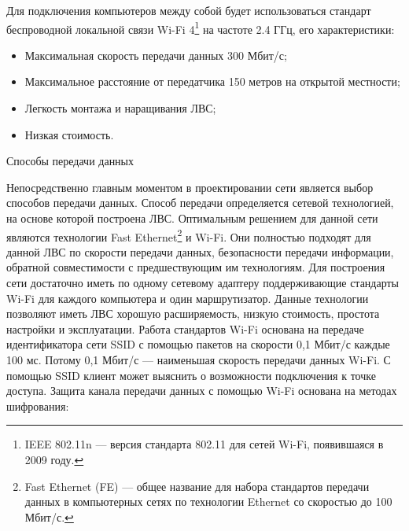 \documentclass[russian,utf8,pointsection,simple,14pt]{eskdtext}
\begin{document}
	\point Для подключения компьютеров между собой будет использоваться стандарт беспроводной локальной связи Wi-Fi 4\footnote{ IEEE 802.11n — версия стандарта 802.11 для сетей Wi-Fi, появившаяся в 2009 году. } на частоте 2.4 ГГц, его характеристики:
	\begin{itemize}
		\item Максимальная скорость передачи данных 300 Мбит/с;
		\item Максимальное расстояние от передатчика 150 метров на открытой местности;
		\item Легкость монтажа и наращивания ЛВС;
		\item Низкая стоимость. 
	\end{itemize}
	
	\point Способы передачи данных
	
	\medskip
	Непосредственно главным моментом в проектировании сети является выбор способов передачи данных. Способ передачи определяется сетевой технологией, на основе которой построена ЛВС. Оптимальным решением для данной сети являются технологии Fast Ethernet\footnote{Fast Ethernet (FE) — общее название для набора стандартов передачи данных в компьютерных сетях по технологии Ethernet со скоростью до 100 Мбит/с.} и Wi-Fi. Они полностью подходят для данной ЛВС по скорости передачи данных, безопасности передачи информации, обратной совместимости с предшествующим им технологиям. Для построения сети достаточно иметь по одному сетевому адаптеру поддерживающие стандарты Wi-Fi для каждого компьютера и один маршрутизатор. Данные технологии позволяют иметь ЛВС хорошую расширяемость, низкую стоимость, простота настройки и эксплуатации. Работа стандартов Wi-Fi основана на передаче идентификатора сети SSID с помощью пакетов на скорости 0,1 Мбит/с каждые 100 мс. Потому 0,1 Мбит/с --- наименьшая скорость передачи данных Wi-Fi. С помощью SSID клиент может выяснить о возможности подключения к точке доступа.
	Защита канала передачи данных с помощью Wi-Fi основана на методах шифрования:
\end{document}
